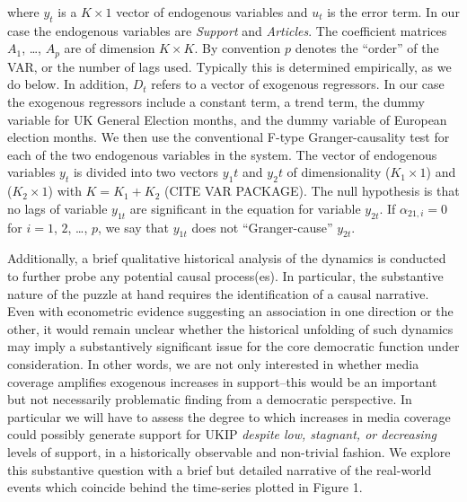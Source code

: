 \documentclass[12pt,article]{article}
\begin{document}
where \(y_t\) is a \(K \times 1\) vector of endogenous variables and
\(u_t\) is the error term. In our case the endogenous variables are
\emph{Support} and \emph{Articles}. The coefficient matrices \(A_1\),
\ldots{}, \(A_p\) are of dimension \(K \times K\). By convention \(p\)
denotes the ``order'' of the VAR, or the number of lags used. Typically
this is determined empirically, as we do below. In addition, \(D_t\)
refers to a vector of exogenous regressors. In our case the exogenous
regressors include a constant term, a trend term, the dummy variable for
UK General Election months, and the dummy variable of European election
months. We then use the conventional F-type Granger-causality test for
each of the two endogenous variables in the system. The vector of
endogenous variables \(y_t\) is divided into two vectors \(y_1t\) and
\(y_2t\) of dimensionality (\(K_1 \times 1\)) and (\(K_2 \times 1\))
with \(K = K_1 + K_2\) (CITE VAR PACKAGE). The null hypothesis is that
no lags of variable \(y_{1t}\) are significant in the equation for
variable \({y}_{2t}\). If \(α_{21, i} = 0\) for \(i = 1\), \(2\),
\ldots{}, \(p\), we say that \(y_{1t}\) does not ``Granger-cause''
\(y_{2t}\).

Additionally, a brief qualitative historical analysis of the dynamics is
conducted to further probe any potential causal process(es). In
particular, the substantive nature of the puzzle at hand requires the
identification of a causal narrative. Even with econometric evidence
suggesting an association in one direction or the other, it would remain
unclear whether the historical unfolding of such dynamics may imply a
substantively significant issue for the core democratic function under
consideration. In other words, we are not only interested in whether
media coverage amplifies exogenous increases in support--this would be
an important but not necessarily problematic finding from a democratic
perspective. In particular we will have to assess the degree to which
increases in media coverage could possibly generate support for UKIP
\emph{despite low, stagnant, or decreasing} levels of support, in a
historically observable and non-trivial fashion. We explore this
substantive question with a brief but detailed narrative of the
real-world events which coincide behind the time-series plotted in
Figure 1.

\pagebreak
\end{document}
